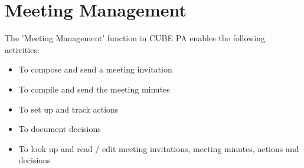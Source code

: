 
\clearpage
\section{Meeting Management}

The 'Meeting Management' function in CUBE PA enables the following activities:


\begin{itemize}
\item
To compose and send a meeting invitation
\item
To compile and send the meeting minutes
\item
To set up and track actions
\item
To document decisions
\item
To look up and read / edit meeting invitations, meeting minutes, actions and decisions
\end{itemize}

\vspace{2cm}

